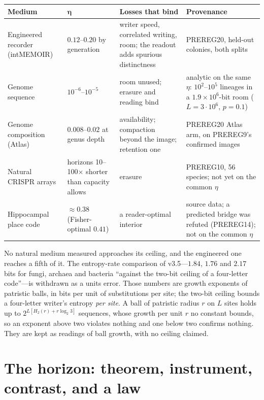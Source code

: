\documentclass[11pt]{article}
\begin{document}
\begin{center}\small
\begin{tabular}{@{}>{\raggedright\arraybackslash}p{3.4cm}>{\raggedright\arraybackslash}p{2.6cm}>{\raggedright\arraybackslash}p{4.4cm}>{\raggedright\arraybackslash}p{3.6cm}@{}}
\toprule
\textbf{Medium} & $\boldsymbol\eta$ & \textbf{Losses that bind} & \textbf{Provenance} \\
\midrule
Engineered recorder (intMEMOIR) & $0.12$--$0.20$ by generation & writer speed, correlated writing, room; the readout adds spurious distinctness & PREREG20, held-out colonies, both splits \\
Genome sequence & $10^{-6}$--$10^{-5}$ & room unused; erasure and reading bind & analytic on the same $\eta$: $10^2$--$10^5$ lineages in a $1.9\times10^6$-bit room ($L=3\cdot10^6$, $p=0.1$) \\
Genome composition (Atlas) & $0.008$--$0.02$ at genus depth & availability; compaction beyond the image; retention one & PREREG20 Atlas arm, on PREREG9's confirmed images \\
Natural CRISPR arrays & horizons 10--100$\times$ shorter than capacity allows & erasure & PREREG10, 56 species; not yet on the common $\eta$ \\
Hippocampal place code & $\approx0.38$ (Fisher-optimal $0.41$) & a reader-optimal interior & 2025 source data; a predicted bridge was refuted (PREREG14); not on the common $\eta$ \\
\bottomrule
\end{tabular}
\end{center}

No natural medium measured approaches its ceiling, and the engineered one reaches a fifth of it. The entropy-rate comparison of v3.5---$1.84$, $1.76$ and $2.17$ bits for fungi, archaea and bacteria ``against the two-bit ceiling of a four-letter code''---is withdrawn as a units error. Those numbers are growth exponents of patristic balls, in bits per unit of substitutions per site; the two-bit ceiling bounds a four-letter writer's entropy \emph{per site}. A ball of patristic radius $r$ on $L$ sites holds up to $2^{L[H_2(r)+r\log_2 3]}$ sequences, whose growth per unit $r$ no constant bounds, so an exponent above two violates nothing and one below two confirms nothing. They are kept as readings of ball growth, with no ceiling claimed.

\section{The horizon: theorem, instrument, contrast, and a law}
\end{document}
